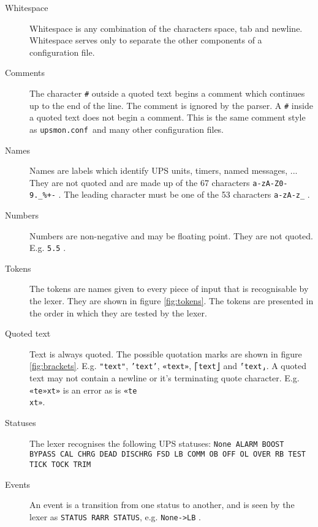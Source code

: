 \documentclass[12pt]{article}
\newcommand{\upsmonconf}{\textcolor{MONCOLOUR}{\texttt{upsmon.conf}}}
\begin{document}
\begin{description}

\item[Whitespace]

Whitespace is any combination of the characters space, tab and
newline.  Whitespace serves only to separate the other components of a
configuration file.

\item[Comments]

The character \texttt{\#} outside a quoted text begins a comment which
continues up to the end of the line.  The comment is ignored by the parser.  A
\texttt{\#} inside a quoted text does not begin a comment.  This is the same
comment style as \upsmonconf\ and many other configuration files.

\item[Names]

Names are labels which identify UPS units, timers, named messages, ...  They
are not quoted and are made up of the 67 characters
\texttt{a-zA-Z0-9.\_\%+-} .  The leading character must be one of the 53
characters \texttt{a-zA-z\_} .

\item[Numbers]

Numbers are non-negative and may be floating point.  They are not quoted.
E.g. \texttt{5.5} .

\item[Tokens]

The tokens are names given to every piece of input that is recognisable by the
lexer.  They are shown in figure \ref{fig:tokens}.  The tokens are presented
in the order in which they are tested by the lexer.

\item[Quoted text]

Text is always quoted.  The possible quotation marks are shown in figure
\ref{fig:brackets}.  E.g. \texttt{"text"}, \texttt{'text'}, \texttt{«text»},
\texttt{⎡text⎦} and \texttt{⸢text⸥}.  A quoted text may not contain a newline
or it's terminating quote character.  E.g.  \texttt{«te»xt»} is an error as is
\texttt{«te}\\
\texttt{xt»}.

\item[Statuses]

The lexer recognises the following UPS statuses: \texttt{None ALARM BOOST
  BYPASS CAL CHRG DEAD DISCHRG FSD LB COMM OB OFF OL OVER RB TEST TICK TOCK
  TRIM}

\item[Events]

An event is a transition from one status to another, and is seen by the lexer
as \texttt{STATUS RARR STATUS}, e.g. \texttt{None->LB} .

\end{description}
\end{document}
